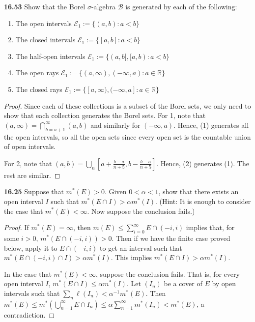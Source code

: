 \documentclass{article}
\newcommand{\R}{\mathbb{R}}
\newcommand{\p}{\textbf}
\begin{document}
\p{16.53} Show that the Borel $\sigma$-algebra $\mathcal{B}$ is generated by each of the following:
\begin{enumerate}
\item The open intervals $\mathcal{E}_1 := \{(a,b) : a < b\}$
\item The closed intervals $\mathcal{E}_1 := \{[a,b] : a < b\}$
\item The half-open intervals $\mathcal{E}_1 := \{(a,b], [a,b) : a < b\}$
\item The open rays $\mathcal{E}_1 := \{(a,\infty), (-\infty,a) : a \in \R\}$
\item The closed rays $\mathcal{E}_1 := \{[a,\infty), (-\infty,a] : a \in \R\}$
\end{enumerate}
\begin{proof}
Since each of these collections is a subset of the Borel sets, we only need to show that each collection generates the Borel sets. For 1, note that $(a, \infty) = \bigcap_{b=a+1}^\infty (a,b)$ and similarly for $(-\infty, a)$. Hence, (1) generates all the open intervals, so all the open sets since every open set is the countable union of open intervals.

For 2, note that $(a,b) = \bigcup_n [a + \frac{b-a} {n+5}, b - \frac{b-a}{n+5}]$. Hence, (2) generates (1). The rest are similar.
\end{proof}

\p{16.25} Suppose that $m^*(E) > 0$. Given $0 < \alpha < 1$, show that there exists an open interval $I$ such that $m^*(E \cap I) > \alpha m^*(I)$. (Hint: It is enough to consider the case that $m^*(E) < \infty$. Now suppose the conclusion fails.)
\begin{proof}
If $m^*(E) = \infty$, then $m(E) \leq \sum_{i=0}^\infty E \cap (-i, i)$ implies that, for some $i > 0$, $m^*(E \cap (-i,i)) > 0$.  Then if we have the finite case proved below, apply it to $E \cap (-i,i)$ to get an interval such that $m^*(E \cap (-i,i) \cap I)  > \alpha m^*(I)$. This implies $m^*(E \cap I) > \alpha m^*(I)$.

In the case that $m^*(E) < \infty$, suppose the conclusion fails. That is, for every open interval $I$, $m^*(E \cap I) \leq \alpha m^*(I)$. Let $(I_n)$ be a cover of $E$ by open intervals such that $\sum_n \ell(I_n) < \alpha^{-1} m^*(E)$. Then $m^*(E) \leq m^*(\bigcup_{n=1}^\infty E \cap I_n) \leq \alpha \sum_{n=1}^\infty m^*(I_n) < m^*(E)$, a contradiction.

\end{proof}
\end{document}
